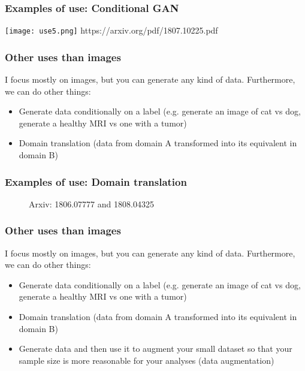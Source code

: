 \documentclass[t]{beamer}
\begin{document}

\begin{frame}
\frametitle{Examples of use: Conditional GAN}

\centering
\texttt{[image: use5.png]}
https://arxiv.org/pdf/1807.10225.pdf

\end{frame}


\begin{frame}
\frametitle{Other uses than images}

I focus mostly on images, but you can generate any kind of data.
Furthermore, we can do other things:

\begin{itemize}
	\item Generate data conditionally on a label (e.g. generate an image of cat vs dog, generate a healthy MRI vs one with a tumor)
	
	\item Domain translation (data from domain A transformed into its equivalent in domain B)
	
\end{itemize}
\end{frame}



\begin{frame}
\frametitle{Examples of use: Domain translation}

\begin{figure}
	\centering
	\qquad
	\caption{Arxiv: 1806.07777 and 1808.04325}%
\end{figure}

\end{frame}


\begin{frame}
\frametitle{Other uses than images}

I focus mostly on images, but you can generate any kind of data.
Furthermore, we can do other things:

\begin{itemize}
	\item Generate data conditionally on a label (e.g. generate an image of cat vs dog, generate a healthy MRI vs one with a tumor)
	
	\item Domain translation (data from domain A transformed into its equivalent in domain B)
	
	\item Generate data and then use it to augment your small dataset so that your sample size is more reasonable for your analyses (data augmentation)
\end{itemize}
\end{frame}
\end{document}
